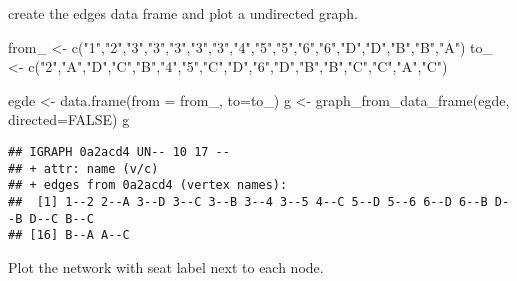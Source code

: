 \documentclass[
]{article}
\newenvironment{Shaded}{\begin{snugshade}}{\end{snugshade}}
\newcommand{\AttributeTok}[1]{\textcolor[rgb]{0.77,0.63,0.00}{#1}}
\newcommand{\CommentTok}[1]{\textcolor[rgb]{0.56,0.35,0.01}{\textit{#1}}}
\newcommand{\ConstantTok}[1]{\textcolor[rgb]{0.00,0.00,0.00}{#1}}
\newcommand{\DecValTok}[1]{\textcolor[rgb]{0.00,0.00,0.81}{#1}}
\newcommand{\FloatTok}[1]{\textcolor[rgb]{0.00,0.00,0.81}{#1}}
\newcommand{\FunctionTok}[1]{\textcolor[rgb]{0.00,0.00,0.00}{#1}}
\newcommand{\NormalTok}[1]{#1}
\newcommand{\OtherTok}[1]{\textcolor[rgb]{0.56,0.35,0.01}{#1}}
\newcommand{\SpecialCharTok}[1]{\textcolor[rgb]{0.00,0.00,0.00}{#1}}
\newcommand{\StringTok}[1]{\textcolor[rgb]{0.31,0.60,0.02}{#1}}
\begin{document}
create the edges data frame and plot a undirected graph.

\begin{Shaded}
\begin{Highlighting}[]
\NormalTok{from\_ }\OtherTok{\textless{}{-}} \FunctionTok{c}\NormalTok{(}\StringTok{"1"}\NormalTok{,}\StringTok{"2"}\NormalTok{,}\StringTok{"3"}\NormalTok{,}\StringTok{"3"}\NormalTok{,}\StringTok{"3"}\NormalTok{,}\StringTok{"3"}\NormalTok{,}\StringTok{"3"}\NormalTok{,}\StringTok{"4"}\NormalTok{,}\StringTok{"5"}\NormalTok{,}\StringTok{"5"}\NormalTok{,}\StringTok{"6"}\NormalTok{,}\StringTok{"6"}\NormalTok{,}\StringTok{"D"}\NormalTok{,}\StringTok{"D"}\NormalTok{,}\StringTok{"B"}\NormalTok{,}\StringTok{"B"}\NormalTok{,}\StringTok{"A"}\NormalTok{)}
\NormalTok{to\_ }\OtherTok{\textless{}{-}} \FunctionTok{c}\NormalTok{(}\StringTok{"2"}\NormalTok{,}\StringTok{"A"}\NormalTok{,}\StringTok{"D"}\NormalTok{,}\StringTok{"C"}\NormalTok{,}\StringTok{"B"}\NormalTok{,}\StringTok{"4"}\NormalTok{,}\StringTok{"5"}\NormalTok{,}\StringTok{"C"}\NormalTok{,}\StringTok{"D"}\NormalTok{,}\StringTok{"6"}\NormalTok{,}\StringTok{"D"}\NormalTok{,}\StringTok{"B"}\NormalTok{,}\StringTok{"B"}\NormalTok{,}\StringTok{"C"}\NormalTok{,}\StringTok{"C"}\NormalTok{,}\StringTok{"A"}\NormalTok{,}\StringTok{"C"}\NormalTok{)}

\NormalTok{egde }\OtherTok{\textless{}{-}} \FunctionTok{data.frame}\NormalTok{(}\AttributeTok{from =}\NormalTok{ from\_, }\AttributeTok{to=}\NormalTok{to\_)}
\NormalTok{g }\OtherTok{\textless{}{-}} \FunctionTok{graph\_from\_data\_frame}\NormalTok{(egde, }\AttributeTok{directed=}\ConstantTok{FALSE}\NormalTok{)}
\NormalTok{g}
\end{Highlighting}
\end{Shaded}

\begin{verbatim}
## IGRAPH 0a2acd4 UN-- 10 17 -- 
## + attr: name (v/c)
## + edges from 0a2acd4 (vertex names):
##  [1] 1--2 2--A 3--D 3--C 3--B 3--4 3--5 4--C 5--D 5--6 6--D 6--B D--B D--C B--C
## [16] B--A A--C
\end{verbatim}

Plot the network with seat label next to each node.

\begin{Shaded}
\end{Shaded}
\end{document}
